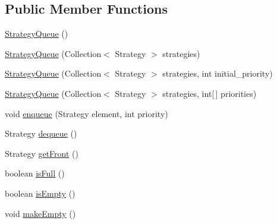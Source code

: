 \subsection*{Public Member Functions}
\begin{DoxyCompactItemize}
\item 
\hyperlink{classch_1_1zhaw_1_1ba10__bsha__1_1_1service_1_1StrategyQueue_3_01Strategy_01extends_01IStrategy_01_4_a93e359e9f2f3e6599556932ebdc2afd9}{StrategyQueue} ()
\item 
\hyperlink{classch_1_1zhaw_1_1ba10__bsha__1_1_1service_1_1StrategyQueue_3_01Strategy_01extends_01IStrategy_01_4_a4c8a5b4f7ced4d925516119b8c74cb31}{StrategyQueue} (Collection$<$ Strategy $>$ strategies)
\item 
\hyperlink{classch_1_1zhaw_1_1ba10__bsha__1_1_1service_1_1StrategyQueue_3_01Strategy_01extends_01IStrategy_01_4_acf78600218c28b5e92fcfd2ebb18316f}{StrategyQueue} (Collection$<$ Strategy $>$ strategies, int initial\_\-priority)
\item 
\hyperlink{classch_1_1zhaw_1_1ba10__bsha__1_1_1service_1_1StrategyQueue_3_01Strategy_01extends_01IStrategy_01_4_ae22c1c70cd9cfa4d5d5d7c62398b76a7}{StrategyQueue} (Collection$<$ Strategy $>$ strategies, int\mbox{[}$\,$\mbox{]} priorities)
\item 
void \hyperlink{classch_1_1zhaw_1_1ba10__bsha__1_1_1service_1_1StrategyQueue_3_01Strategy_01extends_01IStrategy_01_4_a599a285ab1a1c49c6a664987897301ec}{enqueue} (Strategy element, int priority)
\item 
Strategy \hyperlink{classch_1_1zhaw_1_1ba10__bsha__1_1_1service_1_1StrategyQueue_3_01Strategy_01extends_01IStrategy_01_4_a7babaf26a238bf7906fef212a5ea2ae0}{dequeue} ()
\item 
Strategy \hyperlink{classch_1_1zhaw_1_1ba10__bsha__1_1_1service_1_1StrategyQueue_3_01Strategy_01extends_01IStrategy_01_4_a52f7573f550132117fdb03083b27e9f4}{getFront} ()
\item 
boolean \hyperlink{classch_1_1zhaw_1_1ba10__bsha__1_1_1service_1_1StrategyQueue_3_01Strategy_01extends_01IStrategy_01_4_a369b0d778468632c08f996c48c55bdb7}{isFull} ()
\item 
boolean \hyperlink{classch_1_1zhaw_1_1ba10__bsha__1_1_1service_1_1StrategyQueue_3_01Strategy_01extends_01IStrategy_01_4_a13f95814e9acdad7a68586e778d65670}{isEmpty} ()
\item 
void \hyperlink{classch_1_1zhaw_1_1ba10__bsha__1_1_1service_1_1StrategyQueue_3_01Strategy_01extends_01IStrategy_01_4_a727c27ccaed1755ff77994dc4b4d50a2}{makeEmpty} ()
\item 

\end{DoxyCompactItemize}

